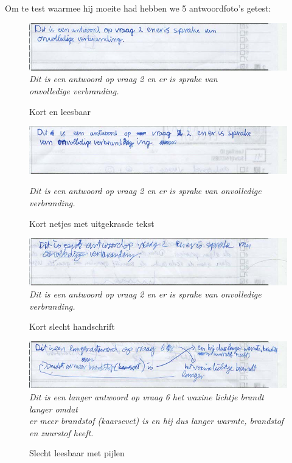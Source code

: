 \documentclass[12pt]{article}
\begin{document}
\begin{multicols}{2}
Om te test waarmee hij moeite had hebben we 5 antwoordfoto's getest:
\begin{figure}[H]
    \centering
    \includegraphics[width=1\linewidth]{./images/methoden/inscannen/tekst/kort_leesbaar.png}
    \textit{Dit is een antwoord op vraag 2 en er is sprake van\\
onvolledige verbranding.}
    \caption{Kort en leesbaar}
    \label{fig:img-short-readable}
\end{figure}
\begin{figure}[H]
    \centering
    \includegraphics[width=1\linewidth]{./images/methoden/inscannen/tekst/kort_leesbaar_uitgekrast.png}

    \textit{Dit is een antwoord op vraag 2 en er is sprake van onvolledige verbranding.}
    \caption{Kort netjes met uitgekrasde tekst}

    \label{fig:img-short-crossed}
\end{figure}
\begin{figure}[H]
    \centering
    \includegraphics[width=1\linewidth]{./images/methoden/inscannen/tekst/kort_onleesbaar.png}
    \textit{Dit is een antwoord op vraag 2 en er is sprake van onvolledige verbranding.}
    \caption{Kort slecht handschrift}

    \label{fig:img-short-unreadable}
\end{figure}
\begin{figure}[H]
    \centering
    \includegraphics[width=1\linewidth]{./images/methoden/inscannen/tekst/slecht_leesbaar_pijlen.png}
    \textit{Dit is een langer antwoord op vraag 6 het waxine lichtje brandt langer omdat \\
er meer brandstof (kaarsevet) is en hij dus langer warmte, brandstof en zuurstof heeft.}
    \caption{Slecht leesbaar met pijlen}


\end{figure}
\end{multicols}
\end{document}
